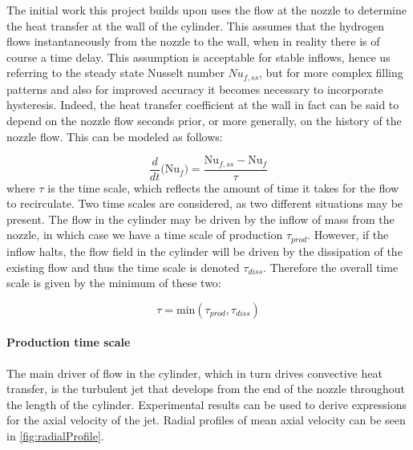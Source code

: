 The initial work this project builds upon uses the flow at the nozzle to determine the heat transfer at the wall of the cylinder. This assumes that the hydrogen flows instantaneously from the nozzle to the wall, when in reality there is of course a time delay. This assumption is acceptable for stable inflows, hence us referring to the steady state Nusselt number ${Nu}_{f,ss}$,  but for more complex filling patterns and also for improved accuracy it becomes necessary to incorporate hysteresis. Indeed, the heat transfer coefficient at the wall in fact can be said to depend on the nozzle flow seconds prior, or more generally, on the history of the nozzle flow. This can be modeled as follows:  

\begin{equation}
\frac{d}{dt}\Big(\text{Nu}_f \Big) = \frac{\text{Nu}_{f,ss}-\text{Nu}_f}{\tau}
\end{equation}
where $\tau$ is the time scale, which reflects the amount of time it takes for the flow to recirculate. Two time scales are considered, as two different situations may be present. The flow in the cylinder may be driven by the inflow of mass from the nozzle, in which case we have a time scale of production $\tau_{prod}$. However, if the inflow halts, the flow field in the cylinder will be driven by the dissipation of the existing flow and thus the time scale is denoted $\tau_{diss}$. Therefore the overall time scale is given by the minimum of these two: 

\begin{equation}
\tau = \text{min}\left(\tau_{prod},\tau_{diss}\right)
\end{equation}



\paragraph{Production time scale}

The main driver of flow in the cylinder, which in turn drives convective heat transfer, is the turbulent jet that develops from the end of the nozzle throughout the length of the cylinder. Experimental results can be used to derive expressions for the axial velocity of the jet. Radial profiles of  mean axial velocity can be seen in \cref{fig:radialProfile}.

